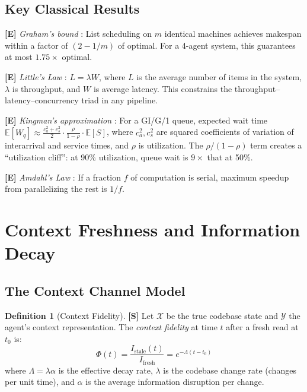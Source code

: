 \documentclass[11pt,a4paper]{article}
\theoremstyle{definition}
\newtheorem{definition}[theorem]{Definition}
\theoremstyle{remark}
\newcommand{\E}{\mathbb{E}}
\begin{document}
\subsection{Key Classical Results}

\textbf{[E]} \emph{Graham's bound} \citep{graham1966bounds}: List scheduling on $m$ identical machines achieves makespan within a factor of $(2 - 1/m)$ of optimal. For a 4-agent system, this guarantees at most $1.75\times$ optimal.

\textbf{[E]} \emph{Little's Law} \citep{little1961proof}: $L = \lambda W$, where $L$ is the average number of items in the system, $\lambda$ is throughput, and $W$ is average latency. This constrains the throughput--latency--concurrency triad in any pipeline.

\textbf{[E]} \emph{Kingman's approximation} \citep{kingman1961single}: For a GI/G/1 queue, expected wait time $\E[W_q] \approx \frac{c_a^2 + c_s^2}{2} \cdot \frac{\rho}{1 - \rho} \cdot \E[S]$, where $c_a^2, c_s^2$ are squared coefficients of variation of interarrival and service times, and $\rho$ is utilization. The $\rho/(1-\rho)$ term creates a ``utilization cliff'': at 90\% utilization, queue wait is $9\times$ that at 50\%.

\textbf{[E]} \emph{Amdahl's Law} \citep{amdahl1967validity}: If a fraction $f$ of computation is serial, maximum speedup from parallelizing the rest is $1/f$.


\section{Context Freshness and Information Decay}\label{sec:freshness}

\subsection{The Context Channel Model}

\begin{definition}[Context Fidelity]\label{def:fidelity}
\textbf{[S]} Let $\mathcal{X}$ be the true codebase state and $\mathcal{Y}$ the agent's context representation. The \emph{context fidelity} at time $t$ after a fresh read at $t_0$ is:
\[
    \Phi(t) = \frac{I_{\mathrm{stale}}(t)}{I_{\mathrm{fresh}}} = e^{-\Lambda(t - t_0)}
\]
where $\Lambda = \lambda \alpha$ is the effective decay rate, $\lambda$ is the codebase change rate (changes per unit time), and $\alpha$ is the average information disruption per change.
\end{definition}
\end{document}
